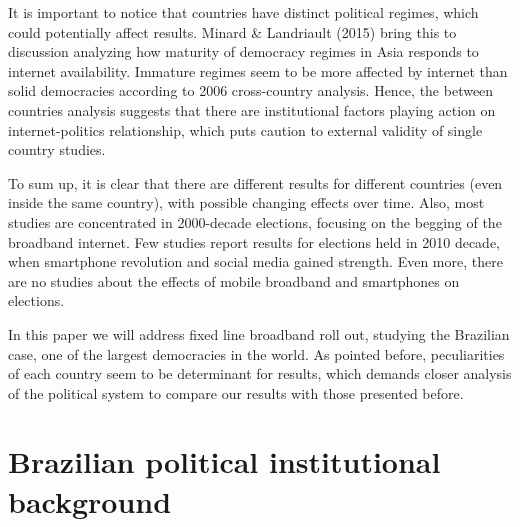 \documentclass[
  12pt,
]{article}
\begin{document}
It is important to notice that countries have distinct political
regimes, which could potentially affect results. Minard \& Landriault
(2015) bring this to discussion analyzing how maturity of democracy
regimes in Asia responds to internet availability. Immature regimes seem
to be more affected by internet than solid democracies according to 2006
cross-country analysis. Hence, the between countries analysis suggests
that there are institutional factors playing action on internet-politics
relationship, which puts caution to external validity of single country
studies.

To sum up, it is clear that there are different results for different
countries (even inside the same country), with possible changing effects
over time. Also, most studies are concentrated in 2000-decade elections,
focusing on the begging of the broadband internet. Few studies report
results for elections held in 2010 decade, when smartphone revolution
and social media gained strength. Even more, there are no studies about
the effects of mobile broadband and smartphones on elections.

In this paper we will address fixed line broadband roll out, studying
the Brazilian case, one of the largest democracies in the world. As
pointed before, peculiarities of each country seem to be determinant for
results, which demands closer analysis of the political system to
compare our results with those presented before.

\hypertarget{brazilian-political-institutional-background}{%
\section{Brazilian political institutional
background}\label{brazilian-political-institutional-background}}
\end{document}
